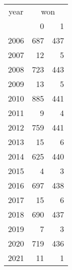 \footnotesize\begin{tabular}[t]{lrr}
\toprule
\multicolumn{1}{c}{year} & \multicolumn{2}{c}{won} \\
\cmidrule(l{3pt}r{3pt}){1-1} \cmidrule(l{3pt}r{3pt}){2-3}
  & 0 & 1\\
\midrule
2006 & 687 & 437\\
2007 & 12 & 5\\
2008 & 723 & 443\\
2009 & 13 & 5\\
2010 & 885 & 441\\
2011 & 9 & 4\\
2012 & 759 & 441\\
2013 & 15 & 6\\
2014 & 625 & 440\\
2015 & 4 & 3\\
2016 & 697 & 438\\
2017 & 15 & 6\\
2018 & 690 & 437\\
2019 & 7 & 3\\
2020 & 719 & 436\\
2021 & 11 & 1\\
\bottomrule
\end{tabular}
